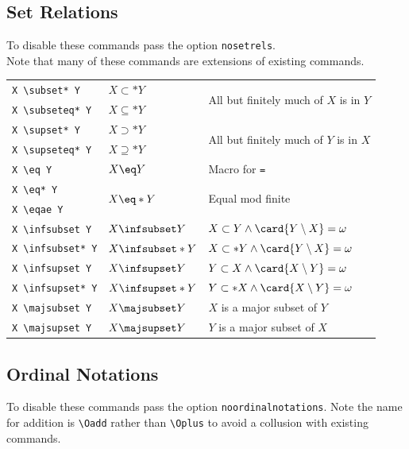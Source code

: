 \documentclass[leqno,11pt]{amsart}
\newcommand{\tab}{\hspace{1cm}}
\begin{document}
\subsection{Set Relations}
To disable these commands pass the option \verb=nosetrels=.\\  Note that many of these commands are extensions of existing commands.

\begin{tabular}{l |  l | l}\toprule
       \verb=X \subset* Y=    		& \( X \subset*    Y\)	& \multirow{2}{*}{All but finitely much of \( X \) is in \( Y \)} \\
   \verb=X \subseteq* Y=            & \( X \subseteq*  Y\)  & \\ \midrule
       \verb=X \supset* Y=              & \( X \supset*    Y\)  & \multirow{2}{*}{All but finitely much of \( Y \) is in \( X \)} \\
   \verb=X \supseteq* Y=            & \( X \supseteq*  Y\)  & \\ \midrule
       \verb=X \eq Y=                   & \( X \eq         Y\)  &  Macro for \verb~=~ \\ \midrule
       \verb=X \eq* Y=                  & \multirow{2}{*}{\( X \eq*        Y\)}  & \multirow{2}{*}{Equal mod finite} \\
  \tab \verb=X \eqae Y=                 & & \\ \midrule
       \verb=X \infsubset Y=            & \( X \infsubset  Y\)  & \( X \subset Y \land \card{Y \setminus X}=\omega \) \\ \midrule
       \verb=X \infsubset* Y=           & \( X \infsubset* Y\)  &  \( X \subset* Y \land \card{Y \setminus X}=\omega \) \\ \midrule
       \verb=X \infsupset Y=            & \( X \infsupset  Y\)  &  \( Y \subset X \land \card{X \setminus Y}=\omega \) \\ \midrule
       \verb=X \infsupset* Y=           & \( X \infsupset* Y\)  & \( Y \subset* X \land \card{X \setminus Y}=\omega \) \\ \midrule
       \verb=X \majsubset Y=            & \( X \majsubset  Y\)  & \( X \) is a major subset of \( Y \) \\ \midrule
       \verb=X \majsupset Y=            & \( X \majsupset  Y\)  & \( Y \) is a major subset of \( X \) \\
		\bottomrule
	\end{tabular}

\subsection{Ordinal Notations}
To disable these commands pass the option \verb=noordinalnotations=.  Note the name for addition is \verb=\Oadd= rather than \verb=\Oplus= to avoid a collusion with existing commands.
\end{document}
